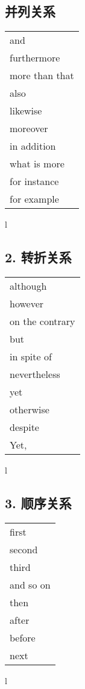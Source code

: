 \subsection{并列关系}

\begin{tabular}{l}
    and            \\
    furthermore    \\
    more than that \\
    also           \\
    likewise       \\
    moreover       \\
    in addition    \\
    what is more   \\
    for instance   \\
    for example    \\
\end{tabular}{l}

\subsection{2. 转折关系}

\begin{tabular}{l}
    although        \\
    however         \\
    on the contrary \\
    but             \\
    in spite of     \\
    nevertheless    \\
    yet             \\
    otherwise       \\
    despite         \\
    Yet,            \\
\end{tabular}{l}

\subsection{3. 顺序关系}

\begin{tabular}{l}
    first     \\
    second    \\
    third     \\
    and so on \\
    then      \\
    after     \\
    before    \\
    next      \\
\end{tabular}{l}


